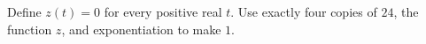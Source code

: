 Define $z(t)=0$ for every positive real $t$. Use exactly four copies of $24$, the function $z$, and exponentiation to make $1$.
